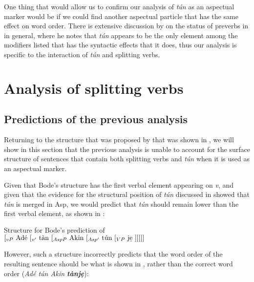 \documentclass[output=paper]{LSP/langsci}
\begin{document}
One thing that would allow us to confirm our analysis of \textit{t\'{u}n} as an aspectual marker would be if we could find another aspectual particle that has the same effect on word order. There is extensive discussion by \citet{Awoyale1974} on the status of preverbs in  in general, where he notes that \textit{t\'{u}n} appears to be the only element among the modifiers listed that has the syntactic effects that it does, thus our analysis is specific to the interaction of \textit{t\'{u}n} and splitting verbs.

\section{Analysis of splitting verbs}
\label{sect:parrish:analysis}

\subsection{Predictions of the previous analysis}

Returning to the structure that was proposed by \citet{Bode2007} that was shown in , we will show in this section that the previous analysis is unable to account for the surface structure of sentences that contain both splitting verbs and \textit{t\'{u}n} when it is used as an aspectual marker.

Given that Bode's structure has the first verbal element appearing on \textit{v}, and given that the evidence for the structural position of \textit{t\'{u}n} discussed in  showed that \textit{t\'{u}n} is merged in Asp, we would predict that \textit{t\'{u}n} should remain lower than the first verbal element, as shown in :

\ea\label{ex:parrish:BodeTunStructure} Structure for Bode's prediction of \\ 

$[_{vP}\text{ Ad\'{e} } [_{v'}\text{ t\`{a}n }[_{AspP}\text{ Akin }[_{Asp'}\text{ t\'{u}n }[_{VP}\text{ j\d{e} }]]]]]$

\z

However, such a structure incorrectly predicts that the word order of the resulting sentence should be what is shown in , rather than the correct word order (\textit{Ad\'{e} t\'{u}n Akin \textbf{t\`{a}nj\d{e}}}):

\label{ex:parrish:BodeTunSentence}
\z
\end{document}
